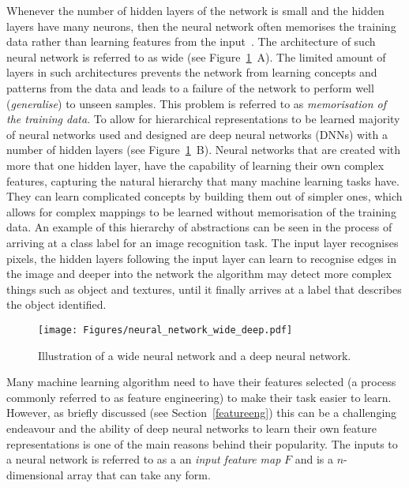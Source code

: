 Whenever the number of hidden layers of the network is small and the hidden layers have many neurons, then the neural network often memorises the training data rather than learning features from the input~\cite{PoggioMRML17}. The architecture of such neural network is referred to as wide (see Figure~\ref{fig:wide}~A). The limited amount of layers in such architectures prevents the network from learning concepts and patterns from the data and leads to a failure of the network to perform well (\textit{generalise}) to unseen samples. This problem is referred to as \textit{memorisation of the  training data}. To allow for hierarchical representations to be learned majority of neural networks used and designed are deep neural networks (DNNs) with a number of hidden layers (see Figure~\ref{fig:wide}~B). Neural networks that are created with more that one hidden layer, have the capability of learning their own complex features, capturing the natural hierarchy that many machine learning tasks have. They can learn complicated concepts by building them out of simpler ones, which allows for complex mappings to be learned without memorisation of the training data. An example of this hierarchy of abstractions can be seen in the process of arriving at a class label for an image recognition task. The input layer recognises pixels, the hidden layers following the input layer can learn to recognise edges in the image and deeper into the network the algorithm may detect more complex things such as object and textures, until it finally arrives at a label that describes the object identified. 


\begin{figure}[ht!]
	\begin{center}
		\texttt{[image: Figures/neural\_network\_wide\_deep.pdf]}
	\end{center}
	\caption{Illustration of a wide neural network and a deep neural network.}
	\label{fig:wide}
\end{figure} 


Many machine learning algorithm need to have their features selected (a process commonly referred to as feature engineering) to make their task easier to learn. However, as briefly discussed (see Section~\ref{featureeng}) this can be a challenging endeavour and the ability of deep neural networks to learn their own feature representations is one of the main reasons behind their popularity. The inputs to a neural network is referred to as a an \textit{input feature map} $F$ and is a $n$-dimensional array that can take any form. 

